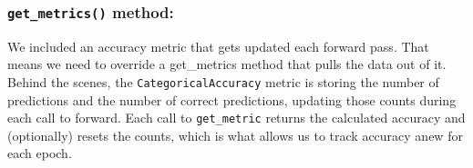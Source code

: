 \documentclass[
]{article}
\begin{document}
\hypertarget{get_metrics-method}{%
\subsubsection{\texorpdfstring{\texttt{get\_metrics()}
method:}{get\_metrics() method:}}\label{get_metrics-method}}

We included an accuracy metric that gets updated each forward pass. That
means we need to override a get\_metrics method that pulls the data out
of it. Behind the scenes, the \texttt{CategoricalAccuracy} metric is
storing the number of predictions and the number of correct predictions,
updating those counts during each call to forward. Each call to
\texttt{get\_metric} returns the calculated accuracy and (optionally)
resets the counts, which is what allows us to track accuracy anew for
each epoch.
\end{document}
